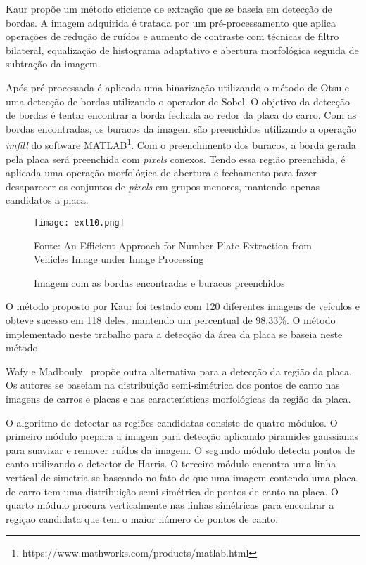 Kaur\cite{kaur2014efficient} propõe um método eficiente de
extração que se baseia em detecção de bordas. A imagem adquirida é tratada por um pré-processamento que aplica operações de redução de ruídos e aumento de contraste com técnicas de filtro bilateral, equalização de histograma adaptativo e abertura morfológica seguida de subtração da imagem.

Após pré-processada é aplicada uma binarização utilizando o método de Otsu e uma detecção de bordas utilizando o operador de Sobel. O objetivo da detecção de bordas é tentar encontrar a borda fechada ao redor da placa do carro. Com as bordas encontradas, os buracos da imagem são preenchidos utilizando a operação \emph{imfill} do software MATLAB\footnote{https://www.mathworks.com/products/matlab.html}. Com o preenchimento dos buracos, a borda gerada pela placa será preenchida com \emph{pixels} conexos. Tendo essa região preenchida, é aplicada uma operação morfológica de abertura e fechamento para fazer desaparecer os conjuntos de \emph{pixels} em grupos menores, mantendo apenas candidatos a placa.

\begin{figure}[H]
	\centering
	\texttt{[image: ext10.png]}
	\caption{Imagem com as bordas encontradas e buracos preenchidos}
Fonte: An Efficient Approach for Number Plate Extraction
from Vehicles Image under Image Processing 
	\label{fig:ext_gray_scale}
\end{figure}

O método proposto por Kaur\cite{kaur2014efficient} foi testado com 120 diferentes imagens de veículos e obteve sucesso em 118 deles, mantendo um percentual de 98.33\%. O método implementado neste trabalho para a detecção da área da placa se baseia neste método.

Wafy e Madbouly~\cite{wafy2016efficient} propõe outra alternativa para a detecção da região da placa. Os autores se baseiam na distribuição semi-simétrica  dos pontos de canto nas imagens de carros e placas e nas características morfológicas da região da placa.

O algoritmo de detectar as regiões candidatas consiste de quatro módulos. O primeiro módulo prepara a imagem para detecção aplicando piramides gaussianas para suavizar e remover ruídos da imagem. O segundo módulo detecta pontos de canto utilizando o detector de Harris. O terceiro módulo encontra uma linha vertical de simetria se baseando no fato de que uma imagem contendo uma placa de carro tem uma distribuição semi-simétrica de pontos de canto na placa. O quarto módulo procura verticalmente nas linhas simétricas para encontrar a regiçao candidata que tem o maior número de pontos de canto. 

